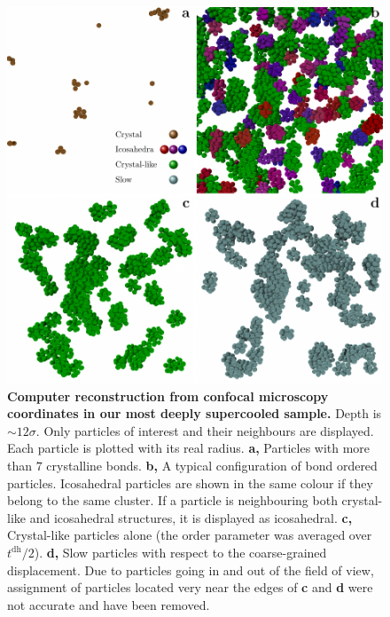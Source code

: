 \begin{figure}
\begin{center}
\includegraphics{generate_figures-figure3.pdf}
\end{center}
\caption{\textbf{Computer reconstruction from confocal microscopy coordinates in our most deeply supercooled sample.} Depth is $\sim 12\sigma$. Only particles of interest and their neighbours are displayed. Each particle is plotted with its real radius. \textbf{a,} Particles with more than $7$ crystalline bonds. \textbf{b,} A typical configuration of bond ordered particles. Icosahedral particles are shown in the same colour if they belong to the same cluster. If a particle is neighbouring both crystal-like and icosahedral structures, it is displayed as icosahedral. \textbf{c,} Crystal-like particles alone (the order parameter was averaged over $t^\text{dh}/2$). \textbf{d,} Slow particles with respect to the coarse-grained displacement. Due to particles going in and out of the field of view, assignment of particles located very near the edges of \textbf{c} and \textbf{d} were not accurate and have been removed.}
	\label{fig:3D}
\end{figure}



